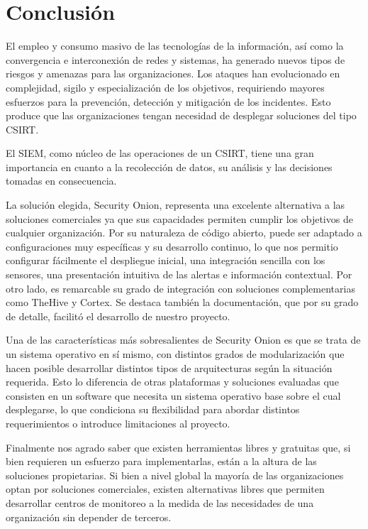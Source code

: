\chapter{Conclusión}
El empleo y consumo masivo de las tecnologías de la información, así como la convergencia e interconexión de redes y sistemas, ha generado nuevos tipos de riesgos y amenazas para las organizaciones. Los ataques han evolucionado en complejidad, sigilo y especialización de los objetivos, requiriendo mayores esfuerzos para la prevención, detección y mitigación de los incidentes. Esto produce que las organizaciones tengan necesidad de desplegar soluciones del tipo CSIRT. \par
El SIEM, como núcleo de las operaciones de un CSIRT, tiene una gran importancia en cuanto a la recolección de datos, su análisis y las decisiones tomadas en consecuencia. \par
La solución elegida, Security Onion, representa una excelente alternativa a las soluciones comerciales ya que sus capacidades permiten cumplir los objetivos de cualquier organización. Por su naturaleza de código abierto, puede ser adaptado a configuraciones muy específicas y su desarrollo continuo, lo que nos permitio configurar fácilmente el despliegue inicial, una integración sencilla con los sensores, una presentación intuitiva de las alertas e información contextual. Por otro lado, es remarcable su grado de integración con soluciones complementarias como TheHive y Cortex. Se destaca también la documentación, que por su grado de detalle, facilitó el desarrollo de nuestro proyecto. \par
Una de las características más sobresalientes de Security Onion es que se trata de un sistema operativo en sí mismo, con distintos grados de modularización que hacen posible desarrollar distintos tipos de arquitecturas según la situación requerida. Esto lo diferencia de otras plataformas y soluciones evaluadas que consisten en un software que necesita un sistema operativo base sobre el cual desplegarse, lo que condiciona su flexibilidad para abordar distintos requerimientos o introduce limitaciones al proyecto. \par
Finalmente nos agrado saber que existen herramientas libres y gratuitas que, si bien requieren un esfuerzo para implementarlas, están a la altura de las soluciones propietarias. Si bien a nivel global la mayoría de las organizaciones optan por soluciones comerciales, existen alternativas libres que permiten desarrollar centros de monitoreo a la medida de las necesidades de una organización sin depender de terceros.
